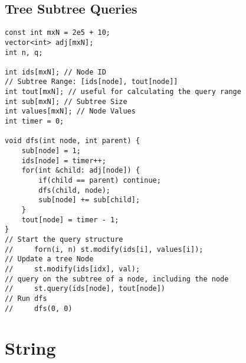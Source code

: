 \documentclass[10pt,letterpaper,twocolumn,twosided]{article}
\begin{document}
\subsection{Tree Subtree Queries}
\begin{lstlisting}
const int mxN = 2e5 + 10;
vector<int> adj[mxN];
int n, q;

int ids[mxN]; // Node ID
// Subtree Range: [ids[node], tout[node]]
int tout[mxN]; // useful for calculating the query range
int sub[mxN]; // Subtree Size
int values[mxN]; // Node Values
int timer = 0;

void dfs(int node, int parent) {
    sub[node] = 1;
    ids[node] = timer++;
    for(int &child: adj[node]) {
        if(child == parent) continue;
        dfs(child, node);
        sub[node] += sub[child];
    }
    tout[node] = timer - 1;
}
// Start the query structure
//     forn(i, n) st.modify(ids[i], values[i]);
// Update a tree Node
//     st.modify(ids[idx], val);
// query on the subtree of a node, including the node
//     st.query(ids[node], tout[node])
// Run dfs
//     dfs(0, 0)
\end{lstlisting}

\section{String}
\end{document}
